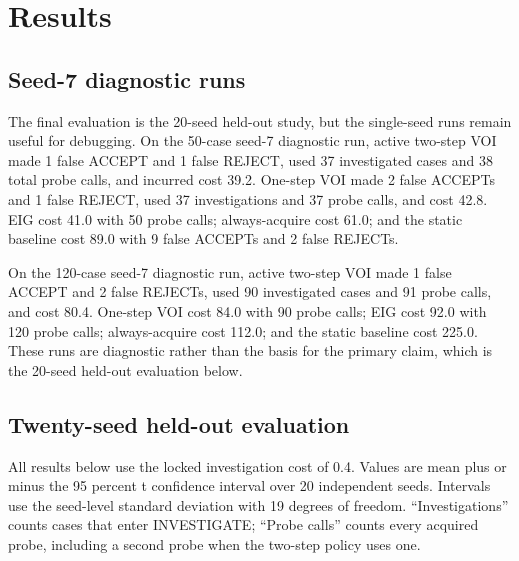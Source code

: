 \documentclass{article}
\begin{document}
\section{Results}

\subsection{Seed-7 diagnostic runs}

The final evaluation is the 20-seed held-out study, but the single-seed runs remain useful for debugging. On the 50-case seed-7 diagnostic run, active two-step VOI made 1 false ACCEPT and 1 false REJECT, used 37 investigated cases and 38 total probe calls, and incurred cost 39.2. One-step VOI made 2 false ACCEPTs and 1 false REJECT, used 37 investigations and 37 probe calls, and cost 42.8. EIG cost 41.0 with 50 probe calls; always-acquire cost 61.0; and the static baseline cost 89.0 with 9 false ACCEPTs and 2 false REJECTs.

On the 120-case seed-7 diagnostic run, active two-step VOI made 1 false ACCEPT and 2 false REJECTs, used 90 investigated cases and 91 probe calls, and cost 80.4. One-step VOI cost 84.0 with 90 probe calls; EIG cost 92.0 with 120 probe calls; always-acquire cost 112.0; and the static baseline cost 225.0. These runs are diagnostic rather than the basis for the primary claim, which is the 20-seed held-out evaluation below.

\subsection{Twenty-seed held-out evaluation}

All results below use the locked investigation cost of 0.4. Values are mean plus or minus the 95 percent t confidence interval over 20 independent seeds. Intervals use the seed-level standard deviation with 19 degrees of freedom. ``Investigations'' counts cases that enter INVESTIGATE; ``Probe calls'' counts every acquired probe, including a second probe when the two-step policy uses one.
\end{document}
